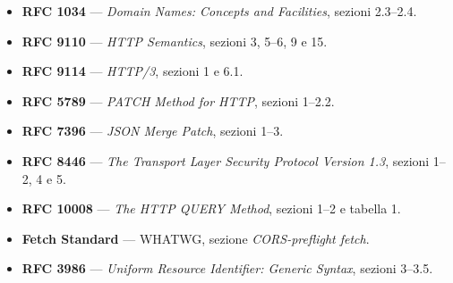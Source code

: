 \begin{itemize}
  \item \textbf{RFC 1034} --- \textit{Domain Names: Concepts and Facilities},
        sezioni 2.3--2.4. \\
  \item \textbf{RFC 9110} --- \textit{HTTP Semantics}, sezioni 3, 5--6, 9 e 15. \\
  \item \textbf{RFC 9114} --- \textit{HTTP/3}, sezioni 1 e 6.1. \\
  \item \textbf{RFC 5789} --- \textit{PATCH Method for HTTP}, sezioni 1--2.2. \\
  \item \textbf{RFC 7396} --- \textit{JSON Merge Patch}, sezioni 1--3. \\
  \item \textbf{RFC 8446} --- \textit{The Transport Layer Security Protocol Version
        1.3}, sezioni 1--2, 4 e 5. \\
  \item \textbf{RFC 10008} --- \textit{The HTTP QUERY Method}, sezioni 1--2 e
        tabella 1. \\
  \item \textbf{Fetch Standard} --- WHATWG, sezione \textit{CORS-preflight fetch}. \\
  \item \textbf{RFC 3986} --- \textit{Uniform Resource Identifier: Generic
        Syntax}, sezioni 3--3.5. \\
\end{itemize}
